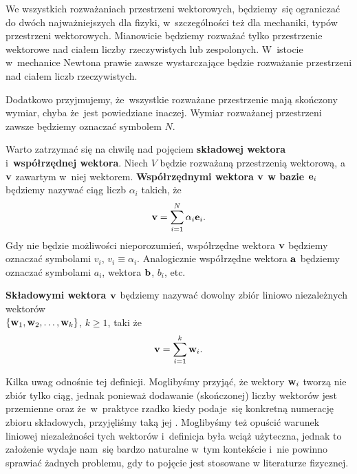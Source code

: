 \documentclass[a4paper,11pt]{article}
\begin{document}




We wszystkich rozważaniach przestrzeni wektorowych, będziemy~się ograniczać
do dwóch najważniejszych dla fizyki, w~szczególności też dla mechaniki,
typów przestrzeni wektorowych. Mianowicie będziemy rozważać tylko
przestrzenie wektorowe nad ciałem liczby rzeczywistych lub zespolonych.
W~istocie w~mechanice Newtona prawie zawsze wystarczające będzie rozważanie
przestrzeni nad ciałem liczb rzeczywistych.

Dodatkowo przyjmujemy, że~wszystkie rozważane przestrzenie mają skończony wymiar, chyba że~jest powiedziane inaczej. Wymiar rozważanej przestrzeni zawsze będziemy oznaczać symbolem $N$.





 Warto zatrzymać się na chwilę nad pojęciem \textbf{składowej wektora} i~\textbf{współrzędnej wektora}. Niech $V$ będzie rozważaną przestrzenią wektorową, a~$\mathbf{v}$ zawartym w~niej wektorem. \textbf{Współrzędnymi wektora $\mathbf{v}$ w bazie $\mathbf{e}_{ i }$} będziemy nazywać ciąg liczb $\alpha_{ i }$ takich, że
\begin{equation}
  \label{eq:SkalmierskiMechanika-01}
  \mathbf{v} = \sum_{ i = 1 }^{ N } \alpha_{ i } \mathbf{e}_{ i }.
\end{equation}
Gdy nie będzie możliwości nieporozumień, współrzędne wektora $\mathbf{v}$
będziemy oznaczać symbolami $v_{ i }$, $v_{ i } \equiv \alpha_{ i }$. Analogicznie
współrzędne wektora $\mathbf{a}$ będziemy oznaczać symbolami $a_{ i }$,
wektora $\mathbf{b}$, $b_{ i }$, etc.

\textbf{Składowymi wektora $\mathbf{v}$} będziemy nazywać dowolny zbiór
liniowo niezależnych wektorów \\
$\{ \mathbf{w}_{ 1 }, \mathbf{w}_{ 2 }, \ldots, \mathbf{w}_{ k } \}$, $k \geq 1$, taki że
\begin{equation}
  \label{eq:SkalmierskiMechanika-02}
  \mathbf{v} = \sum_{ i = 1 }^{ k } \mathbf{w}_{ i }.
\end{equation}

Kilka uwag odnośnie tej definicji. Moglibyśmy przyjąć, że wektory
$\mathbf{w}_{ i }$ tworzą nie zbiór tylko ciąg, jednak ponieważ dodawanie
(skończonej) liczby wektorów jest przemienne oraz że~w~praktyce rzadko
kiedy podaje~się konkretną numerację zbioru składowych, przyjęliśmy taką
jej . Moglibyśmy też opuścić warunek liniowej niezależności tych
wektorów i~definicja była wciąż użyteczna, jednak to założenie wydaje
nam~się bardzo naturalne w~tym kontekście i~nie powinno sprawiać żadnych
problemu, gdy to pojęcie jest stosowane w literaturze fizycznej.
\end{document}
